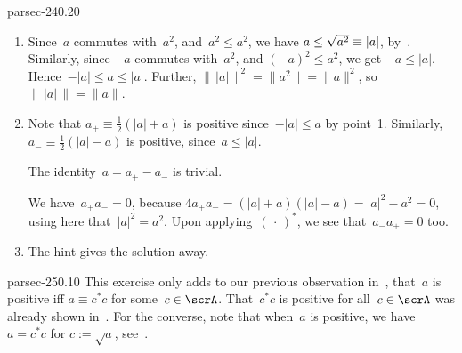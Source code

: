 \documentclass[b5page]{book}
\begin{document}
\begin{solution}{parsec-240.20}
\begin{enumerate}
\item
Since~$a$ commutes with~$a^2$,
and~$a^2\leq a^2$,
we have $a\leq \smash{\sqrt{a^2}}\equiv\left|a\right|$,
by~.
Similarly, since $-a$ commutes with~$a^2$,
and $(-a)^2\leq a^2$,
we get $-a\leq \left|a\right|$.
Hence~$-\left|a\right|\leq a\leq \left|a\right|$.
Further, $\|\,\left|a\right|\,\|^2
= \|a^2\|=\|a\|^2$, so~$\|\,\left|a\right|\,\|=\|a\|$.
\item
Note that $a_+\equiv \frac{1}{2}(\left|a\right|+a)$
is positive
since~$-\left|a\right|\leq a$ by point~1.
Similarly, $a_-\equiv \frac{1}{2}(\left|a\right|-a)$
is positive, since~$a\leq \left|a\right|$.

The identity~$a=a_+-a_- $ is trivial.

We have~$a_+a_-=0$, because $4a_+a_- = (\left|a\right|+a)(\left|a\right|-a)
= \left|a\right|^2 - a^2=0$,
using here that~$\left|a\right|^2 = a^2$.
Upon applying~$(\,\cdot\,)^*$,
we see that~$a_-a_+=0$ too.

\item
The hint gives the solution away.
\end{enumerate}
\end{solution}
\begin{solution}{parsec-250.10}
This exercise
only adds to our previous observation
in~,
that~$a$ is positive iff
$a\equiv c^*c$ for some~$c\in\scrA$.
That~$c^*c$ is positive for all~$c\in\scrA$
was already shown in~.
For the converse, note that when~$a$ is positive,
we have $a=c^*c$
for $c:=\sqrt{a}$,
see~.
\end{solution}
\end{document}
